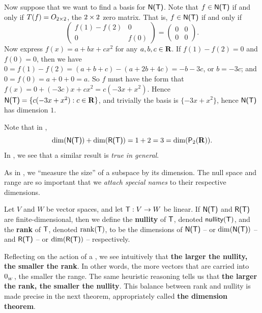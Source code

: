 \begin{example}
Now suppose that we want to find a basis for \(\textsf{N(T)}\).
Note that \(f \in \textsf{N(T)}\) if and only if \(T(f) = O_{2 \times 2}\), the \(2 \times 2\) zero matrix.
That is, \(f \in \textsf{N(T)}\) if and only if
\[
    \begin{pmatrix}
        f(1) - f(2) & 0 \\
        0 & f(0)
    \end{pmatrix}
    = \begin{pmatrix}
        0 & 0 \\
        0 & 0
    \end{pmatrix}.
\]
Now express \(f(x) = a + bx + cx^2\) for any \(a, b, c \in \mathbf{R}\).
If \(f(1) - f(2) = 0\) and \(f(0) = 0\), then we have \(0 = f(1) - f(2) = (a + b + c) - (a + 2b + 4c) = -b - 3c\), or \(b = -3c\);
and \(0 = f(0) = a + 0 + 0 = a\).
So \(f\) must have the form that \(f(x) = 0 + (-3c) x + c x^2 = c(-3x + x^2)\).
Hence \(\textsf{N(T)} = \{ c(-3x + x^2) : c \in \mathbf{R} \}\), and trivially the basis is \(\{ -3x + x^2 \}\), hence \(\textsf{N(T)}\) has dimension \(1\).
\end{example}

\begin{remark} \label{remark 2.1.6}
Note that in ,
\[
    \dim(\textsf{N(T)}) + \dim(\textsf{R(T)}) = 1 + 2 = 3 = \dim(\textsf{P}_2(\mathbf{R})).
\]
In , we see that a similar result is \emph{true in general}.
\end{remark}

As in , we ``measure the size'' of a subspace by its dimension.
The null space and range are so important that we \emph{attach special names} to their respective dimensions.

\begin{definition} \label{def 2.3}
Let \(V\) and \(W\) be vector spaces, and let \(\textsf{T} : V \to W\) be linear.
If \(\textsf{N(T)}\) and \(\textsf{R(T)}\) are finite-dimensional, then we define the \textbf{nullity} of \(\textsf{T}\), denoted \(\textsf{nullity}(\textsf{T})\), and the \textbf{rank} of \(\textsf{T}\), denoted \(\mathrm{rank}(\textsf{T})\),
to be the dimensions of \(\textsf{N(T)}\) -- or \(\dim(\textsf{N(T)})\) -- and \(\textsf{R(T)}\) -- or \(\dim(\textsf{R(T)})\) -- respectively.
\end{definition}

\begin{remark} \label{remark 2.1.7}
Reflecting on the action of a \LTRAN{}, we see intuitively that \textbf{the larger the nullity, the smaller the rank}.
In other words, the more vectors that are carried into \(0_{_W}\), the smaller the range.
The same heuristic reasoning tells us that \textbf{the larger the rank, the smaller the nullity}.
This balance between rank and nullity is made precise in the next theorem, appropriately called \textbf{the dimension theorem}.
\end{remark}


